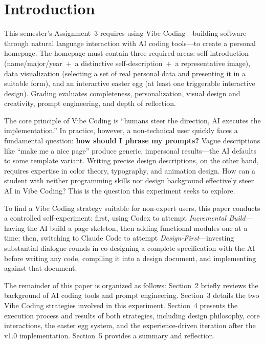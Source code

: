 \section{Introduction}

This semester's Assignment~3 requires using Vibe Coding---building software through natural language interaction with AI coding tools---to create a personal homepage.
The homepage must contain three required areas: self-introduction (name/major/year~$+$~a distinctive self-description~$+$~a representative image), data visualization (selecting a set of real personal data and presenting it in a suitable form), and an interactive easter egg (at least one triggerable interactive design).
Grading evaluates completeness, personalization, visual design and creativity, prompt engineering, and depth of reflection.

The core principle of Vibe Coding is ``humans steer the direction, AI executes the implementation.'' In practice, however, a non-technical user quickly faces a fundamental question: \textbf{how should I phrase my prompts?}
Vague descriptions like ``make me a nice page'' produce generic, impersonal results---the AI defaults to some template variant. Writing precise design descriptions, on the other hand, requires expertise in color theory, typography, and animation design.
How can a student with neither programming skills nor design background effectively steer AI in Vibe Coding? This is the question this experiment seeks to explore.

To find a Vibe Coding strategy suitable for non-expert users, this paper conducts a controlled self-experiment: first, using Codex to attempt \textit{Incremental Build}---having the AI build a page skeleton, then adding functional modules one at a time; then, switching to Claude Code to attempt \textit{Design-First}---investing substantial dialogue rounds in co-designing a complete specification with the AI before writing any code, compiling it into a design document, and implementing against that document.

The remainder of this paper is organized as follows: Section~2 briefly reviews the background of AI coding tools and prompt engineering. Section~3 details the two Vibe Coding strategies involved in this experiment. Section~4 presents the execution process and results of both strategies, including design philosophy, core interactions, the easter egg system, and the experience-driven iteration after the v1.0 implementation. Section~5 provides a summary and reflection.
